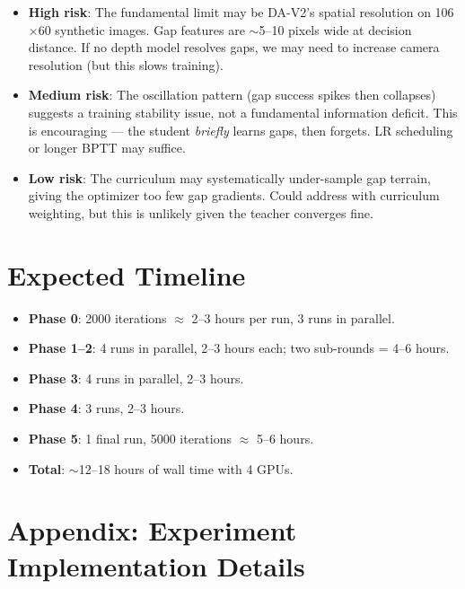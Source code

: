 \documentclass[11pt,a4paper]{article}
\begin{document}
\begin{itemize}
  \item \textbf{High risk}: The fundamental limit may be DA-V2's spatial
        resolution on 106$\times$60 synthetic images.  Gap features are
        $\sim$5--10 pixels wide at decision distance.  If no depth model
        resolves gaps, we may need to increase camera resolution (but this
        slows training).

  \item \textbf{Medium risk}: The oscillation pattern (gap success spikes
        then collapses) suggests a training stability issue, not a
        fundamental information deficit.  This is encouraging --- the
        student \emph{briefly} learns gaps, then forgets.  LR scheduling or
        longer BPTT may suffice.

  \item \textbf{Low risk}: The curriculum may systematically under-sample
        gap terrain, giving the optimizer too few gap gradients.  Could
        address with curriculum weighting, but this is unlikely given the
        teacher converges fine.
\end{itemize}

\section{Expected Timeline}

\begin{itemize}[nosep]
  \item \textbf{Phase 0}: 2000 iterations $\approx$ 2--3 hours per run,
        3 runs in parallel.
  \item \textbf{Phase 1--2}: 4 runs in parallel, 2--3 hours each; two
        sub-rounds = 4--6 hours.
  \item \textbf{Phase 3}: 4 runs in parallel, 2--3 hours.
  \item \textbf{Phase 4}: 3 runs, 2--3 hours.
  \item \textbf{Phase 5}: 1 final run, 5000 iterations $\approx$ 5--6 hours.
  \item \textbf{Total}: $\sim$12--18 hours of wall time with 4 GPUs.
\end{itemize}

\section{Appendix: Experiment Implementation Details}
\end{document}
